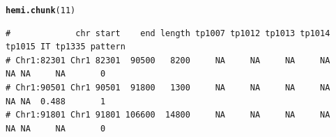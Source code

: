 \documentclass{article}\usepackage[]{graphicx}\usepackage[]{color}
\makeatletter
\newcommand{\hlnum}[1]{\textcolor[rgb]{0.686,0.059,0.569}{#1}}%
\newcommand{\hlstd}[1]{\textcolor[rgb]{0.345,0.345,0.345}{#1}}%
\newcommand{\hlkwd}[1]{\textcolor[rgb]{0.737,0.353,0.396}{\textbf{#1}}}%
\newenvironment{kframe}{%
 \def\at@end@of@kframe{}%
 \ifinner\ifhmode%
  \def\at@end@of@kframe{\end{minipage}}%
  \begin{minipage}{\columnwidth}%
 \fi\fi%
 \def\FrameCommand##1{\hskip\@totalleftmargin \hskip-\fboxsep
 \colorbox{shadecolor}{##1}\hskip-\fboxsep
     \hskip-\linewidth \hskip-\@totalleftmargin \hskip\columnwidth}%
 \MakeFramed {\advance\hsize-\width
   \@totalleftmargin\z@ \linewidth\hsize
   \@setminipage}}%
 {\par\unskip\endMakeFramed%
 \at@end@of@kframe}
\newenvironment{knitrout}{}{} %
\makeatother
\begin{document}
\begin{knitrout}\footnotesize
{}\color{fgcolor}\begin{kframe}
\begin{alltt}
\hlkwd{hemi.chunk}\hlstd{(}\hlnum{11}\hlstd{)}
\end{alltt}
\begin{verbatim}
#             chr start    end length tp1007 tp1012 tp1013 tp1014 tp1015 IT tp1335 pattern
# Chr1:82301 Chr1 82301  90500   8200     NA     NA     NA     NA     NA NA     NA       0
# Chr1:90501 Chr1 90501  91800   1300     NA     NA     NA     NA     NA NA  0.488       1
# Chr1:91801 Chr1 91801 106600  14800     NA     NA     NA     NA     NA NA     NA       0
\end{verbatim}
\end{kframe}


\end{knitrout}
\end{document}
